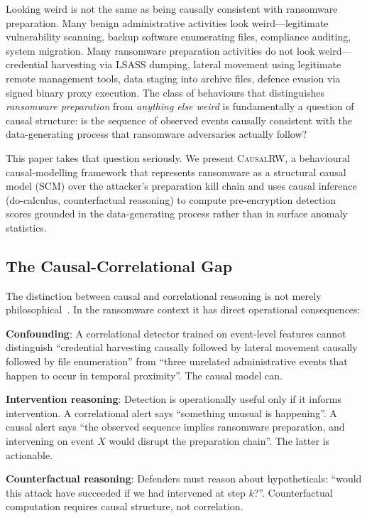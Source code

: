 \documentclass[sigconf,nonacm]{acmart}
\begin{document}
Looking weird is not the same as being causally consistent with
ransomware preparation. Many benign administrative activities look
weird---legitimate vulnerability scanning, backup software enumerating
files, compliance auditing, system migration. Many ransomware
preparation activities do not look weird---credential harvesting via
LSASS dumping, lateral movement using legitimate remote management
tools, data staging into archive files, defence evasion via signed
binary proxy execution. The class of behaviours that distinguishes
\emph{ransomware preparation} from \emph{anything else weird} is
fundamentally a question of causal structure: is the sequence of
observed events causally consistent with the data-generating process
that ransomware adversaries actually follow?

This paper takes that question seriously. We present \textsc{CausalRW},
a behavioural causal-modelling framework that represents ransomware as
a structural causal model (SCM) over the attacker's preparation kill
chain and uses causal inference (do-calculus, counterfactual reasoning)
to compute pre-encryption detection scores grounded in the
data-generating process rather than in surface anomaly statistics.

\subsection{The Causal-Correlational Gap}

The distinction between causal and correlational reasoning is not
merely philosophical~\cite{pearl2009causality}. In the ransomware
context it has direct operational consequences:

\textbf{Confounding}: A correlational detector trained on event-level
features cannot distinguish ``credential harvesting causally followed by
lateral movement causally followed by file enumeration'' from ``three
unrelated administrative events that happen to occur in temporal
proximity''. The causal model can.

\textbf{Intervention reasoning}: Detection is operationally useful only
if it informs intervention. A correlational alert says ``something
unusual is happening''. A causal alert says ``the observed sequence
implies ransomware preparation, and intervening on event $X$ would
disrupt the preparation chain''. The latter is actionable.

\textbf{Counterfactual reasoning}: Defenders must reason about
hypotheticals: ``would this attack have succeeded if we had intervened
at step $k$?''. Counterfactual computation requires causal structure,
not correlation.
\end{document}
